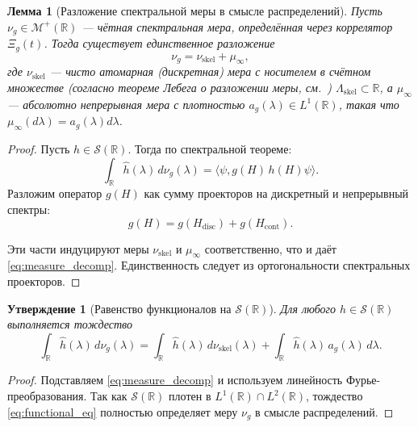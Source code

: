 \documentclass{article}
\numberwithin{equation}{section}
\theoremstyle{plain}
\newtheorem{lemma}{Лемма}
\newtheorem{proposition}{Утверждение}
\theoremstyle{definition}
\theoremstyle{remark}
\def\infty{∞}\def\partial{∂}\def\sum{Σ}\def\int{∫}%
\begin{document}
\begin{lemma}[Разложение спектральной меры в смысле распределений]
\label{lemma:measure-decomp}
Пусть $\nu_g\in\mathcal M^+(\mathbb R)$ — чётная спектральная мера, 
определённая через коррелятор $\Xi_g(t)$.
Тогда существует единственное разложение
\begin{equation}
\label{eq:measure_decomp}
\nu_g = \nu_{\mathrm{skel}} + \mu_\infty,
\end{equation}
где $\nu_{\mathrm{skel}}$ — чисто атомарная (дискретная) мера с носителем  
в счётном множестве (согласно теореме Лебега о разложении меры, см.~\cite{Halmos1974}) $\Lambda_{\mathrm{skel}}\subset\mathbb R$,  
а $\mu_\infty$ — абсолютно непрерывная мера с плотностью 
$a_g(\lambda)\in L^1(\mathbb R)$, такая что $\mu_\infty(d\lambda)=a_g(\lambda)d\lambda$.
\end{lemma}

\begin{proof}
Пусть $h\in\mathcal S(\mathbb R)$. Тогда по спектральной теореме:
\begin{equation}
\int_{\mathbb R} \widehat h(\lambda)\,d\nu_g(\lambda)
= \langle \psi, g(H)\,h(H)\psi\rangle.
\label{eq:QSSC0047}
\end{equation}
Разложим оператор $g(H)$ как сумму проекторов на дискретный и непрерывный спектры:
\begin{equation}
g(H) = g(H_{\mathrm{disc}}) + g(H_{\mathrm{cont}}).
\label{eq:QSSC0048}
\end{equation}

Эти части индуцируют меры $\nu_{\mathrm{skel}}$ и $\mu_\infty$ соответственно,
что и даёт \eqref{eq:measure_decomp}. Единственность следует из ортогональности спектральных проекторов.
\end{proof}

\begin{proposition}[Равенство функционалов на $\mathcal S(\mathbb R)$]
\label{prop:functional_eq}
Для любого $h\in\mathcal S(\mathbb R)$ выполняется тождество
\begin{equation}
\label{eq:functional_eq}
\int_{\mathbb R} \widehat h(\lambda)\,d\nu_g(\lambda)
= \int_{\mathbb R} \widehat h(\lambda)\,d\nu_{\mathrm{skel}}(\lambda)
+ \int_{\mathbb R} \widehat h(\lambda)\,a_g(\lambda)\,d\lambda.
\end{equation}
\end{proposition}

\begin{proof}
Подставляем \eqref{eq:measure_decomp} и используем линейность Фурье-преобразования.
Так как $\mathcal S(\mathbb R)$ плотен в $L^1(\mathbb R)\cap L^2(\mathbb R)$, 
тождество \eqref{eq:functional_eq} полностью определяет меру $\nu_g$ в смысле распределений.
\end{proof}
\end{document}
